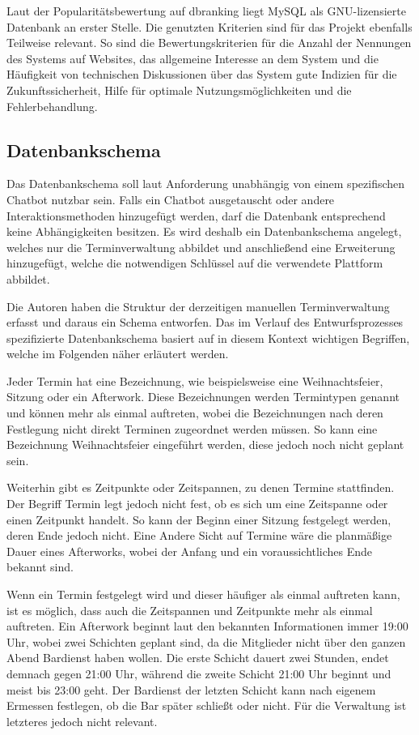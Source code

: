 Laut der Popularitätsbewertung auf {dbranking} liegt MySQL als GNU-lizensierte Datenbank an erster Stelle. Die genutzten Kriterien sind für das Projekt ebenfalls Teilweise relevant. So sind die Bewertungskriterien für die Anzahl der Nennungen des Systems auf Websites, das allgemeine Interesse an dem System und die Häufigkeit von technischen Diskussionen über das System gute Indizien für die Zukunftssicherheit, Hilfe für optimale Nutzungsmöglichkeiten und die Fehlerbehandlung.



\subsection{Datenbankschema}

Das Datenbankschema soll laut Anforderung unabhängig von einem spezifischen Chatbot nutzbar sein. Falls ein Chatbot ausgetauscht oder andere Interaktionsmethoden hinzugefügt werden, darf die Datenbank entsprechend keine Abhängigkeiten besitzen. Es wird deshalb ein Datenbankschema angelegt, welches nur die Terminverwaltung abbildet und anschließend eine Erweiterung hinzugefügt, welche die notwendigen Schlüssel auf die verwendete Plattform abbildet.

Die Autoren haben die Struktur der derzeitigen manuellen Terminverwaltung erfasst und daraus ein Schema entworfen. 
Das im Verlauf des Entwurfsprozesses spezifizierte Datenbankschema basiert auf in diesem Kontext wichtigen Begriffen, welche im Folgenden näher erläutert werden.

Jeder Termin hat eine Bezeichnung, wie beispielsweise eine Weihnachtsfeier, Sitzung oder ein Afterwork. Diese Bezeichnungen werden Termintypen genannt und können mehr als einmal auftreten, wobei die Bezeichnungen nach deren Festlegung nicht direkt Terminen zugeordnet werden müssen. So kann eine Bezeichnung Weihnachtsfeier eingeführt werden, diese jedoch noch nicht geplant sein.

Weiterhin gibt es Zeitpunkte oder Zeitspannen, zu denen Termine stattfinden. Der Begriff Termin legt jedoch nicht fest, ob es sich um eine Zeitspanne oder einen Zeitpunkt handelt. So kann der Beginn einer Sitzung festgelegt werden, deren Ende jedoch nicht. Eine Andere Sicht auf Termine wäre die planmäßige Dauer eines Afterworks, wobei der Anfang und ein voraussichtliches Ende bekannt sind.

Wenn ein Termin festgelegt wird und dieser häufiger als einmal auftreten kann, ist es möglich, dass auch die Zeitspannen und Zeitpunkte mehr als einmal auftreten. Ein Afterwork beginnt laut den bekannten Informationen immer 19:00 Uhr, wobei zwei Schichten geplant sind, da die Mitglieder nicht über den ganzen Abend Bardienst haben wollen. Die erste Schicht dauert zwei Stunden, endet demnach gegen 21:00 Uhr, während die zweite Schicht 21:00 Uhr beginnt und meist bis 23:00 geht. Der Bardienst der letzten Schicht kann nach eigenem Ermessen festlegen, ob die Bar später schließt oder nicht. Für die Verwaltung ist letzteres jedoch nicht relevant.

